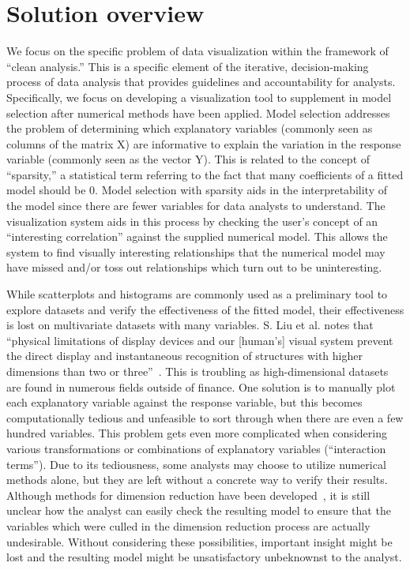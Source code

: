 \section{Solution overview}
\label{sec:intro:solution}

We focus on the specific problem of data visualization within the framework of ``clean analysis.'' This is a specific element of the iterative, decision-making process of data analysis that provides guidelines and accountability for analysts. Specifically, we focus on developing a visualization tool to supplement in model selection after numerical methods have been applied. Model selection addresses the problem of determining which explanatory variables (commonly seen as columns of the matrix X) are informative to explain the variation in the response variable (commonly seen as the vector Y). This is related to the concept of ``sparsity,'' a statistical term referring to the fact that many coefficients of a fitted model should be 0. Model selection with sparsity aids in the interpretability of the model since there are fewer variables for data analysts to understand. The visualization system aids in this process by checking the user's concept of an ``interesting correlation'' against the supplied numerical model. This allows the system to find visually interesting relationships that the numerical model may have missed and/or toss out relationships which turn out to be uninteresting.

While scatterplots and histograms are commonly used as a preliminary tool to explore datasets and verify the effectiveness of the fitted model, their effectiveness is lost on multivariate datasets with many variables. S. Liu et al. notes that ``physical limitations of display devices and our [human's] visual system prevent the direct display and instantaneous recognition of structures with higher dimensions than two or three''~\cite{lius2016}. This is troubling as high-dimensional datasets are found in numerous fields outside of finance. One solution is to manually plot each explanatory variable against the response variable, but this becomes computationally tedious and unfeasible to sort through when there are even a few hundred variables. This problem gets even more complicated when considering various transformations or combinations of explanatory variables (``interaction terms''). Due to its tediousness, some analysts may choose to utilize numerical methods alone, but they are left without a concrete way to verify their results. Although methods for dimension reduction have been developed~\cite{lius2016}, it is still unclear how the analyst can easily check the resulting model to ensure that the variables which were culled in the dimension reduction process are actually undesirable. Without considering these possibilities, important insight might be lost and the resulting model might be unsatisfactory unbeknownst to the analyst. 

